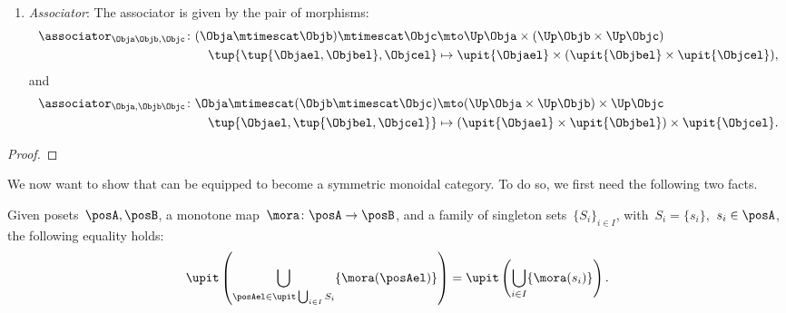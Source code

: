 \begin{lemma}
\begin{enumerate}
    \item \emph{Associator}: The associator is given by the pair of morphisms:
    \begin{equation}
        \begin{aligned}
            \associator_{\Obja\Objb,\Objc}\colon (\Obja\mtimescat \Objb)\mtimescat \Objc &\mto \Up \Obja\times (\Up \Objb \times \Up \Objc)\\
            \tup{\tup{\Objael,\Objbel},\Objcel}&\mapsto \upit\{\Objael\}\times (\upit\{\Objbel\}\times \upit\{\Objcel\}),
        \end{aligned}
    \end{equation}
    and
    \begin{equation}
        \begin{aligned}
            \associator_{\Obja,\Objb\Objc}\colon \Obja\mtimescat (\Objb\mtimescat \Objc) &\mto (\Up \Obja\times \Up \Objb) \times \Up \Objc\\
            \tup{\Objael,\tup{\Objbel,\Objcel}}&\mapsto (\upit\{\Objael\}\times \upit\{\Objbel\})\times \upit\{\Objcel\}.
        \end{aligned}
    \end{equation}
\end{enumerate}
\end{lemma}
\begin{proof}
\end{proof}

We now want to show that \UPos can be equipped to become a symmetric monoidal category.
To do so, we first need the following two facts.

\begin{lemma}
  \label{lem:unpack_u_functor}
  Given posets~$\posA,\posB$, a monotone map~$\mora \colon \posA \to \posB$, and a family of singleton sets~$\{S_i\}_{i\in I}$, with~$S_i=\{s_i\}$,~$s_i\in \posA$, the following equality holds:
  \begin{equation}
    \label{eq:lemma_unpack}
    \upit \left( \bigcup_{\posAel \in \upit \bigcup_{i\in I}S_i}\{\mora(\posAel)\}\right)= \upit \left( \bigcup_{i\in I} \{\mora(s_i)\}\right).
  \end{equation}
\end{lemma}


